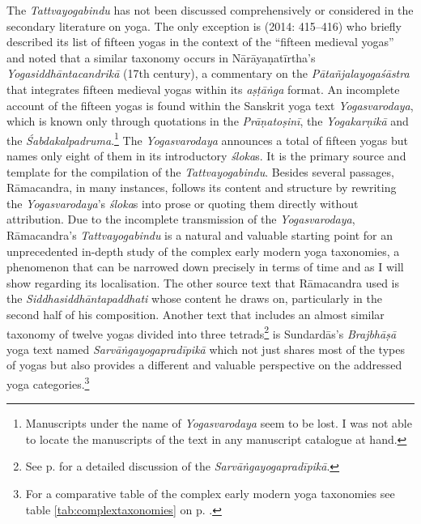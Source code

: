The \textit{Tattvayogabindu} has not been discussed comprehensively or considered in the secondary literature on yoga. The only exception is \citeauthor{birch2014} (2014: 415–416) who briefly described its list of fifteen yogas in the context of the ``fifteen medieval yogas'' and noted that a similar taxonomy occurs in Nārāyaṇatīrtha’s \textit{Yogasiddhāntacandrikā} (17th century), a commentary on the \textit{Pātañjalayogaśāstra} that integrates fifteen medieval yogas within its \textit{aṣṭāṅga} format. An incomplete account of the fifteen yogas is found within the Sanskrit yoga text \textit{Yogasvarodaya}, which is known only through quotations in the \textit{Prāṇatoṣinī}, the \textit{Yogakarṇikā} and the \emph{Śabdakalpadruma}.\footnote{Manuscripts under the name of \textit{Yogasvarodaya} seem to be lost. I was not able to locate the manuscripts of the text in any manuscript catalogue at hand.} The \textit{Yogasvarodaya} announces a total of fifteen yogas but names only eight of them in its introductory \textit{śloka}s. It is the primary source and template for the compilation of the \textit{Tattvayogabindu}. Besides several passages, Rāmacandra, in many instances, follows its content and structure by rewriting the \textit{Yogasvarodaya}’s \textit{śloka}s into prose or quoting them directly without attribution. Due to the incomplete transmission of the \textit{Yogasvarodaya}, Rāmacandra’s \textit{Tattvayogabindu} is a natural and valuable starting point for an unprecedented in-depth study of the complex early modern yoga taxonomies, a phenomenon that can be narrowed down precisely in terms of time and as I will show regarding its localisation. The other source text that Rāmacandra used is the \textit{Siddhasiddhāntapaddhati} whose content he draws on, particularly in the second half of his composition. Another text that includes an almost similar taxonomy of twelve yogas divided into three tetrads\footnote{See p.\pageref{sarvasarva} for a detailed discussion of the \textit{Sarvāṅgayogapradīpikā}.} is Sundardās’s \textit{Brajbhāṣā} yoga text named \textit{Sarvāṅgayogapradīpikā} which not just shares most of the types of yogas but also provides a different and valuable perspective on the addressed yoga categories.\footnote{For a comparative table of the complex early modern yoga taxonomies see table \ref{tab:complextaxonomies} on p. \pageref{tab:complextaxonomies}.}

